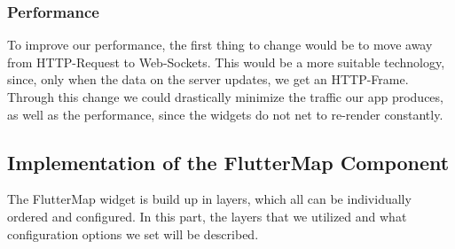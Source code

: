 \subsubsection{Performance}
To improve our performance, the first thing to change would be to move away from HTTP-Request to Web-Sockets. This would be a more suitable technology, since, only when the data on the server updates, we get an HTTP-Frame. Through this change we could drastically minimize the traffic our app produces, as well as the performance, since the widgets do not net to re-render constantly.   

\subsection{Implementation of the FlutterMap Component}

The FlutterMap widget is build up in layers, which all can be individually ordered and configured. In this part, the layers that we utilized and what configuration options we set will be described. 

